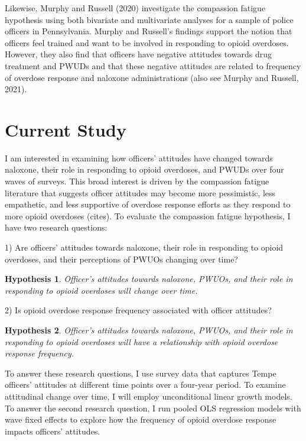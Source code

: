 Likewise, Murphy and Russell (2020) investigate the compassion fatigue hypothesis using both bivariate and multivariate analyses for a sample of police officers in Pennsylvania. Murphy and Russell’s findings support the notion that officers feel trained and want to be involved in responding to opioid overdoses. However, they also find that officers have negative attitudes towards drug treatment and PWUDs and that these negative attitudes are related to frequency of overdose response and naloxone administrations (also see Murphy and Russell, 2021).

\section{Current Study}

I am interested in examining how officers’ attitudes have changed towards naloxone, their role in responding to opioid overdoses, and PWUDs over four waves of surveys. This broad interest is driven by the compassion fatigue literature that suggests officer attitudes may become more pessimistic, less empathetic, and less supportive of overdose response efforts as they respond to more opioid overdoses (cites). To evaluate the compassion fatigue hypothesis, I have two research questions:

1) Are officers’ attitudes towards naloxone, their role in responding to opioid overdoses, and their perceptions of PWUOs changing over time? 

\newtheorem{hypothesis}{Hypothesis}

\begin{hypothesis} Officer's attitudes towards naloxone, PWUOs, and their role in responding to opioid overdoses will change over time.\end{hypothesis}

2) Is opioid overdose response frequency associated with officer attitudes? 

\begin{hypothesis} Officer's attitudes towards naloxone, PWUOs, and their role in responding to opioid overdoses will have a relationship with opioid overdose response frequency. \end{hypothesis}

To answer these research questions, I use survey data that captures Tempe officers’ attitudes at different time points over a four-year period. To examine attitudinal change over time, I will employ unconditional linear growth models. To answer the second research question, I run pooled OLS regression models with wave fixed effects to explore how the frequency of opioid overdose response impacts officers’ attitudes.


